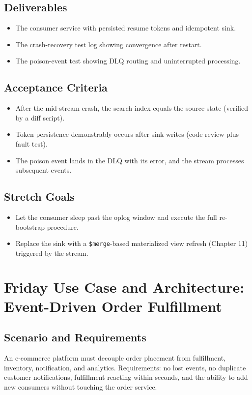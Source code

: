 \subsection*{Deliverables}
\begin{itemize}
    \item The consumer service with persisted resume tokens and idempotent sink.
    \item The crash-recovery test log showing convergence after restart.
    \item The poison-event test showing DLQ routing and uninterrupted processing.
\end{itemize}

\subsection*{Acceptance Criteria}
\begin{itemize}
    \item After the mid-stream crash, the search index equals the source state (verified by a diff script).
    \item Token persistence demonstrably occurs after sink writes (code review plus fault test).
    \item The poison event lands in the DLQ with its error, and the stream processes subsequent events.
\end{itemize}

\subsection*{Stretch Goals}
\begin{itemize}
    \item Let the consumer sleep past the oplog window and execute the full re-bootstrap procedure.
    \item Replace the sink with a \texttt{\$merge}-based materialized view refresh (Chapter 11) triggered by the stream.
\end{itemize}

\section{Friday Use Case and Architecture: Event-Driven Order Fulfillment}
\subsection{Scenario and Requirements}
An e-commerce platform must decouple order placement from fulfillment, inventory, notification, and analytics. Requirements: no lost events, no duplicate customer notifications, fulfillment reacting within seconds, and the ability to add new consumers without touching the order service.

